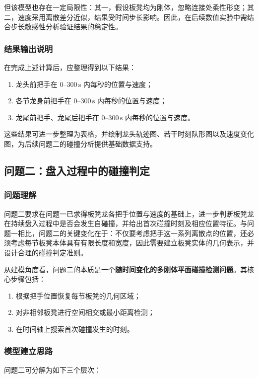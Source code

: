 \documentclass[12pt,a4paper]{ctexart}
\begin{document}
但该模型也存在一定局限性：其一，假设板凳均为刚体，忽略连接处柔性形变；其二，速度采用离散差分近似，结果受时间步长影响。因此，在后续数值实验中需结合步长敏感性分析验证结果的稳定性。

\subsubsection{结果输出说明}
在完成上述计算后，应整理得到以下结果：
\begin{enumerate}
    \item 龙头前把手在 $0$--$300\,\mathrm{s}$ 内每秒的位置与速度；
    \item 各节龙身前把手在 $0$--$300\,\mathrm{s}$ 内每秒的位置与速度；
    \item 龙尾前把手、龙尾后把手在 $0$--$300\,\mathrm{s}$ 内每秒的位置与速度。
\end{enumerate}

\noindent 这些结果可进一步整理为表格，并绘制龙头轨迹图、若干时刻队形图以及速度变化图，为后续问题二的碰撞分析提供基础数据支持。
\subsection{问题二：盘入过程中的碰撞判定}

\subsubsection{问题理解}
问题二要求在问题一已求得板凳龙各把手位置与速度的基础上，进一步判断板凳龙在持续盘入过程中是否会发生自碰撞，并给出首次碰撞时刻及相应位置特征。与问题一相比，问题二的关键变化在于：不仅要考虑把手这一系列离散点的位置，还必须考虑每节板凳本体具有有限长度和宽度，因此需要建立板凳实体的几何表示，并设计合理的碰撞判定准则。

从建模角度看，问题二的本质是一个\textbf{随时间变化的多刚体平面碰撞检测问题}。其核心步骤包括：
\begin{enumerate}
    \item 根据把手位置恢复每节板凳的几何区域；
    \item 对非相邻板凳进行空间相交或最小距离检测；
    \item 在时间轴上搜索首次碰撞发生的时刻。
\end{enumerate}

\subsubsection{模型建立思路}
问题二可分解为如下三个层次：
\end{document}
